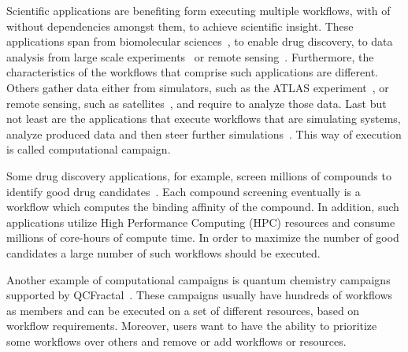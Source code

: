 
Scientific applications are benefiting form executing multiple workflows, with of without dependencies amongst them, to achieve scientific insight.
These applications span from biomolecular sciences~\cite{dakka2018concurrent}, to enable drug discovery, to data analysis from large scale experiments~\cite{atlas} or remote sensing~\cite{goncalves2020sealnet}.
Furthermore, the characteristics of the workflows that comprise such applications are different.
Others gather data either from simulators, such as the ATLAS experiment~\cite{atlas}, or remote sensing, such as satellites~\cite{goncalves2020sealnet}, and require to analyze those data.
Last but not least are the applications that execute workflows that are simulating systems, analyze produced data and then steer further simulations~\cite{}.
This way of execution is called computational campaign.

Some drug discovery applications, for example, screen millions of compounds to identify good drug candidates~\cite{dakka2018concurrent}.
Each compound screening eventually is a workflow which computes the binding affinity of the compound.
In addition, such applications utilize High Performance Computing (HPC) resources and consume millions of core-hours of compute time.
In order to maximize the number of good candidates a large number of such workflows should be executed.

Another example of computational campaigns is quantum chemistry campaigns supported by QCFractal~\cite{qcfractal}.
These campaigns usually have hundreds of workflows as members and can be executed on a set of different resources, based on workflow requirements.
Moreover, users want to have the ability to prioritize some workflows over others and remove or add workflows or resources.

